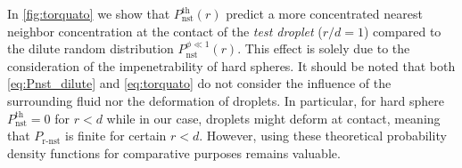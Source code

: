 In \ref{fig:torquato} we show that $P_\text{nst}^\text{th}(r)$ predict a more concentrated nearest neighbor concentration at the contact of the \textit{test droplet} ($r/d=1$) compared to the dilute random distribution $P_\text{nst}^{\phi\ll 1}(r)$. 
This effect is solely due to the consideration of the impenetrability of hard spheres. 
It should be noted that both \ref{eq:Pnst_dilute} and \ref{eq:torquato} do not consider the influence of the surrounding fluid nor the deformation of droplets. 
In particular, for hard sphere $P_\text{nst}^\text{th} = 0$ for $r<d$ while in our case, droplets might deform at contact, meaning that $P_\text{r-nst}$ is finite for certain $r<d$. 
However, using these theoretical probability density functions for comparative purposes remains valuable. 


